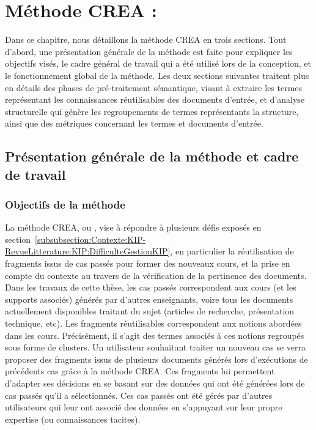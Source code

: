 \chapter{Méthode CREA : \MyCREA}
\label{chapter:CREA}

Dans ce chapitre, nous détaillons la méthode CREA en trois sections.
Tout d'abord, une présentation générale de la méthode est faite pour expliquer les objectifs visés, le cadre général de travail qui a été utilisé lors de la conception, et le fonctionnement global de la méthode.
Les deux sections suivantes traitent plus en détails des phases de pré-traitement sémantique, visant à extraire les termes représentant les connaissances réutilisables des documents d'entrée, et d'analyse structurelle qui génère les regroupements  de termes représentants la structure, ainsi que des métriques concernant les termes et documents d'entrée.

\bigskip

\minitoc %

\newpage


\section{Présentation générale de la méthode et cadre de travail}
\label{section:CREA:PresentationGenerale}

\subsection{Objectifs de la méthode}
\label{subsection:CREA:ObjectifsMethode}


La méthode CREA, ou \textit{\MyCREA}, vise à répondre à plusieurs défis exposés en section~\ref{subsubsection:Contexte:KIP-RevueLitterature:KIP:DifficulteGestionKIP}, en particulier la réutilisation de fragments issus de cas passés pour former des nouveaux cours, et la prise en compte du contexte au travers de la vérification de la pertinence des documents.
Dans les travaux de cette thèse, les cas passés correspondent aux cours (et les supports associés) générés par d'autres enseignants, voire tous les documents actuellement disponibles traitant du sujet (articles de recherche, présentation technique, etc).
Les fragments réutilisables correspondent aux notions abordées dans les cours.
Précisément, il s'agit des termes associés à ces notions regroupés sous forme de clusters.
Un utilisateur souhaitant traiter un nouveau cas se verra proposer des fragments issus de plusieurs documents générés lors d'exécutions de précédents cas grâce à la méthode CREA.
Ces fragments lui permettent d'adapter ses décisions en se basant sur des données qui ont été générées lors de cas passés qu'il a sélectionnés.
Ces cas passés ont été gérés par d'autres utilisateurs qui leur ont associé des données en s'appuyant sur leur propre expertise (ou connaissances tacites).

